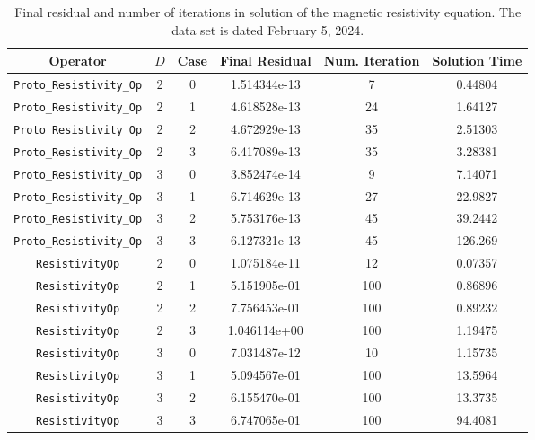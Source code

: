 \documentclass{article}
\begin{document}
\begin{small}
\begin{table}
\begin{center}
\begin{tabular}{|c|c|c|c|c||c|} \hline
 Operator                   & $D$ & Case & Final Residual &
 Num. Iteration & Solution Time\\
\hline
 \hline
 {\tt Proto\_Resistivity\_Op}     & 2   & 0    & 1.514344e-13   &        7 & 0.44804\\
 {\tt Proto\_Resistivity\_Op}     & 2   & 1    & 4.618528e-13   &       24 & 1.64127\\
 {\tt Proto\_Resistivity\_Op}     & 2   & 2    & 4.672929e-13   &       35 & 2.51303\\
 {\tt Proto\_Resistivity\_Op}     & 2   & 3    & 6.417089e-13   &       35 & 3.28381\\
 {\tt Proto\_Resistivity\_Op}     & 3   & 0    & 3.852474e-14   &        9 & 7.14071\\
 {\tt Proto\_Resistivity\_Op}     & 3   & 1    & 6.714629e-13   &       27 & 22.9827\\
 {\tt Proto\_Resistivity\_Op}     & 3   & 2    & 5.753176e-13   &       45 & 39.2442\\
 {\tt Proto\_Resistivity\_Op}     & 3   & 3    & 6.127321e-13   &       45 & 126.269\\
 \hline
 {\tt ResistivityOp}              & 2   & 0    & 1.075184e-11   &   12& 0.07357\\
 {\tt ResistivityOp}              & 2   & 1    & 5.151905e-01   &  100& 0.86896\\
 {\tt ResistivityOp}              & 2   & 2    & 7.756453e-01   &  100& 0.89232\\
 {\tt ResistivityOp}              & 2   & 3    & 1.046114e+00   &  100& 1.19475\\
 {\tt ResistivityOp}              & 3   & 0    & 7.031487e-12   &   10& 1.15735\\
 {\tt ResistivityOp}              & 3   & 1    & 5.094567e-01   &  100& 13.5964\\
 {\tt ResistivityOp}              & 3   & 2    & 6.155470e-01   &  100& 13.3735\\
 {\tt ResistivityOp}              & 3   & 3    & 6.747065e-01   &  100& 94.4081\\
\hline
\end{tabular}
\end{center}
\label{tab::resist}
\caption
    {
      Final residual and number of iterations in solution of the
      magnetic resistivity equation.
      The data set is dated February 5, 2024.
    }
\end{table}
\end{small}
\end{document}

